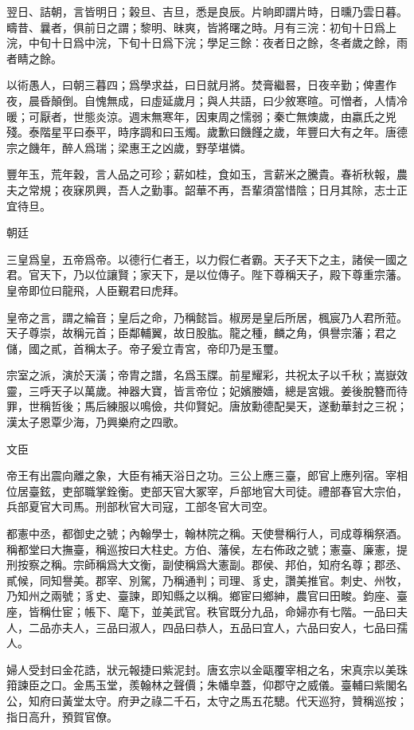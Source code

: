 \documentclass[12pt,a4paper]{ctexbook}
\begin{document}
翌日、詰朝，言皆明日；榖旦、吉旦，悉是良辰。片晌即謂片時，日曛乃雲日暮。疇昔、曩者，俱前日之謂；黎明、昧爽，皆將曙之時。月有三浣：初旬十日爲上浣，中旬十日爲中浣，下旬十日爲下浣；學足三餘：夜者日之餘，冬者歲之餘，雨者睛之餘。\par
以術愚人，曰朝三暮四；爲學求益，曰日就月將。焚膏繼晷，日夜辛勤；俾晝作夜，晨昏顛倒。自愧無成，曰虛延歲月；與人共語，曰少敘寒暄。可憎者，人情冷暖；可厭者，世態炎涼。週末無寒年，因東周之懦弱；秦亡無燠歲，由嬴氏之兇殘。泰階星平曰泰平，時序調和曰玉燭。歲歉曰饑饉之歲，年豐曰大有之年。唐德宗之饑年，醉人爲瑞；梁惠王之凶歲，野莩堪憐。\par
豐年玉，荒年穀，言人品之可珍；薪如桂，食如玉，言薪米之騰貴。春祈秋報，農夫之常規；夜寐夙興，吾人之勤事。韶華不再，吾輩須當惜陰；日月其除，志士正宜待旦。\par
朝廷\par
三皇爲皇，五帝爲帝。以德行仁者王，以力假仁者霸。天子天下之主，諸侯一國之君。官天下，乃以位讓賢；家天下，是以位傳子。陛下尊稱天子，殿下尊重宗藩。皇帝即位曰龍飛，人臣覲君曰虎拜。\par
皇帝之言，謂之綸音；皇后之命，乃稱懿旨。椒房是皇后所居，楓宸乃人君所蒞。天子尊崇，故稱元首；臣鄰輔翼，故日股肱。龍之種，麟之角，俱譽宗藩；君之儲，國之貳，首稱太子。帝子爰立青宮，帝印乃是玉璽。\par
宗室之派，演於天潢；帝胄之譜，名爲玉牒。前星耀彩，共祝太子以千秋；嵩嶽效靈，三呼天子以萬歲。神器大寶，皆言帝位；妃嬪媵嬙，總是宮娥。姜後脫簪而待罪，世稱哲後；馬后練服以鳴儉，共仰賢妃。唐放勳德配昊天，遂動華封之三祝；漢太子恩覃少海，乃興樂府之四歌。\par
文臣\par
帝王有出震向離之象，大臣有補天浴日之功。三公上應三臺，郎官上應列宿。宰相位居臺鉉，吏部職掌銓衡。吏部天官大冢宰，戶部地官大司徒。禮部春官大宗伯，兵部夏官大司馬。刑部秋官大司寇，工部冬官大司空。\par
都憲中丞，都御史之號；內翰學士，翰林院之稱。天使譽稱行人，司成尊稱祭酒。稱都堂曰大撫臺，稱巡按曰大柱史。方伯、藩侯，左右佈政之號；憲臺、廉憲，提刑按察之稱。宗師稱爲大文衡，副使稱爲大憲副。郡侯、邦伯，知府名尊；郡丞、貳候，同知譽美。郡宰、別駕，乃稱通判；司理、豸史，讚美推官。刺史、州牧，乃知州之兩號；豸史、臺諫，即知縣之以稱。鄉宦曰鄉紳，農官曰田畯。鈞座、臺座，皆稱仕宦；帳下、麾下，並美武官。秩官既分九品，命婦亦有七階。一品曰夫人，二品亦夫人，三品曰淑人，四品曰恭人，五品曰宜人，六品曰安人，七品曰孺人。\par
婦人受封曰金花誥，狀元報捷曰紫泥封。唐玄宗以金甌覆宰相之名，宋真宗以美珠箝諫臣之口。金馬玉堂，羨翰林之聲價；朱幡皁蓋，仰郡守之威儀。臺輔曰紫閣名公，知府曰黃堂太守。府尹之祿二千石，太守之馬五花驄。代天巡狩，贊稱巡按；指日高升，預賀官僚。\par
\end{document}
